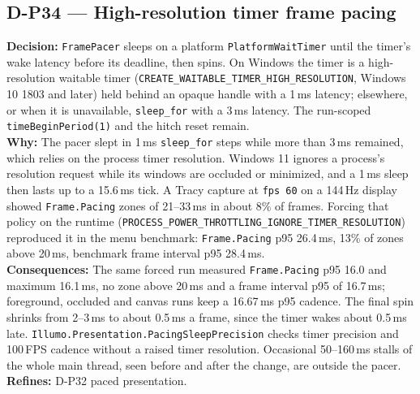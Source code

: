 \subsection*{D-P34 --- High-resolution timer frame pacing}
\begin{decisionbox}[title={D-P34 \quad 2026-09-28}]
\textbf{Decision:} \texttt{FramePacer} sleeps on a platform
\texttt{PlatformWaitTimer} until the timer's wake latency before its deadline,
then spins. On Windows the timer is a high-resolution waitable timer
(\texttt{CREATE\_WAITABLE\_TIMER\_HIGH\_RESOLUTION}, Windows 10 1803 and
later) held behind an opaque handle with a 1\,ms latency; elsewhere, or when
it is unavailable, \texttt{sleep\_for} with a 3\,ms latency. The run-scoped
\texttt{timeBeginPeriod(1)} and the hitch reset remain.\\
\textbf{Why:} The pacer slept in 1\,ms \texttt{sleep\_for} steps while more
than 3\,ms remained, which relies on the process timer resolution. Windows 11
ignores a process's resolution request while its windows are occluded or
minimized, and a 1\,ms sleep then lasts up to a 15.6\,ms tick. A Tracy capture
at \texttt{fps 60} on a 144\,Hz display showed \texttt{Frame.Pacing} zones of
21--33\,ms in about 8\% of frames. Forcing that policy on the runtime
(\texttt{PROCESS\_POWER\_THROTTLING\_IGNORE\_TIMER\_RESOLUTION}) reproduced it
in the menu benchmark: \texttt{Frame.Pacing} p95 26.4\,ms, 13\% of zones above
20\,ms, benchmark frame interval p95 28.4\,ms.\\
\textbf{Consequences:} The same forced run measured \texttt{Frame.Pacing} p95
16.0 and maximum 16.1\,ms, no zone above 20\,ms and a frame interval p95 of
16.7\,ms; foreground, occluded and canvas runs keep a 16.67\,ms p95 cadence.
The final spin shrinks from 2--3\,ms to about 0.5\,ms a frame, since the timer
wakes about 0.5\,ms late. \texttt{Illumo.Presentation.PacingSleepPrecision}
checks timer precision and 100\,FPS cadence without a raised timer resolution.
Occasional 50--160\,ms stalls of the whole main thread, seen before and after
the change, are outside the pacer.\\
\textbf{Refines:} D-P32 paced presentation.
\end{decisionbox}


